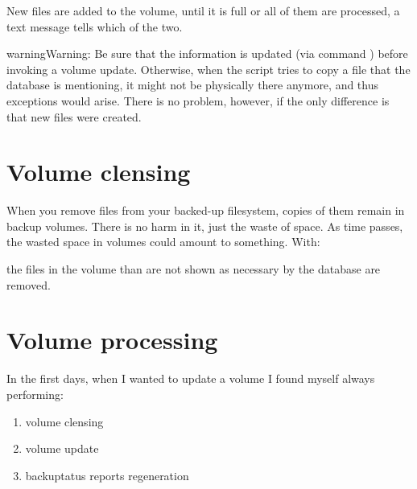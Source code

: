 \documentclass[letterpaper,10pt,english]{sphinxmanual}
\begin{document}
New files are added to the volume, until it is full or all of them are processed, a text message tells which of the two.

\begin{sphinxadmonition}{warning}{Warning:}
Be sure that the  information is updated (via command ) before invoking a volume update. Otherwise, when the script tries to copy a file that the database is mentioning, it might not be physically there anymore, and thus exceptions would arise. There is no problem, however, if the only difference is that new files were created.
\end{sphinxadmonition}


\section{Volume clensing}
\label{\detokenize{index:volume-clensing}}
When you remove files from your backed-up filesystem, copies of them remain in backup volumes. There is no harm in it,
just the waste of space. As time passes, the wasted space in volumes could amount to something. With:

\begin{sphinxVerbatim}[commandchars=\\\{\}]
   
\end{sphinxVerbatim}

the files in the volume than are not shown as necessary by the database are removed.


\section{Volume processing}
\label{\detokenize{index:volume-processing}}
In the first days, when I wanted to update a volume I found myself always performing:
\begin{enumerate}
\item {} 
volume clensing

\item {} 
volume update

\item {} 
backuptatus reports regeneration

\end{enumerate}
\end{document}
